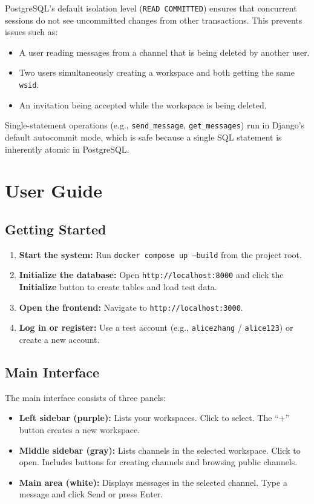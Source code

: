 \documentclass[11pt]{article}
\begin{document}
PostgreSQL's default isolation level (\texttt{READ COMMITTED}) ensures that concurrent sessions do not see uncommitted changes from other transactions. This prevents issues such as:

\begin{itemize}
    \item A user reading messages from a channel that is being deleted by another user.
    \item Two users simultaneously creating a workspace and both getting the same \texttt{wsid}.
    \item An invitation being accepted while the workspace is being deleted.
\end{itemize}

Single-statement operations (e.g., \texttt{send\_message}, \texttt{get\_messages}) run in Django's default autocommit mode, which is safe because a single SQL statement is inherently atomic in PostgreSQL.


\newpage
\section{User Guide}
\label{sec:guide}

\subsection{Getting Started}

\begin{enumerate}
    \item \textbf{Start the system:} Run \texttt{docker compose up --build} from the project root.
    \item \textbf{Initialize the database:} Open \texttt{http://localhost:8000} and click the \textbf{Initialize} button to create tables and load test data.
    \item \textbf{Open the frontend:} Navigate to \texttt{http://localhost:3000}.
    \item \textbf{Log in or register:} Use a test account (e.g., \texttt{alicezhang} / \texttt{alice123}) or create a new account.
\end{enumerate}

\subsection{Main Interface}

The main interface consists of three panels:
\begin{itemize}
    \item \textbf{Left sidebar (purple):} Lists your workspaces. Click to select. The ``+'' button creates a new workspace.
    \item \textbf{Middle sidebar (gray):} Lists channels in the selected workspace. Click to open. Includes buttons for creating channels and browsing public channels.
    \item \textbf{Main area (white):} Displays messages in the selected channel. Type a message and click Send or press Enter.
\end{itemize}
\end{document}
